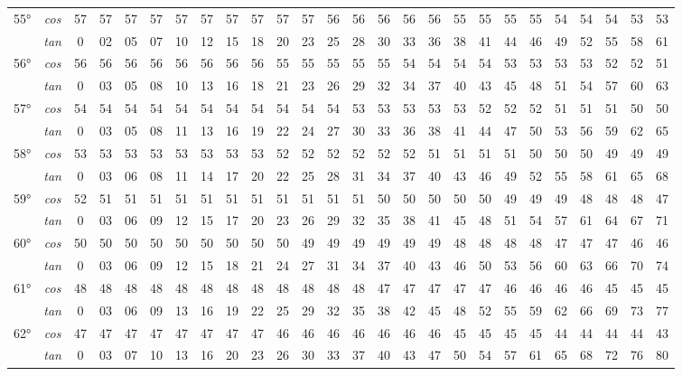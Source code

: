 \begin{tiny}
\begin{longtable}{c c |c |c |c |c |c |c |c |c |c |c |c |c |c |c |c |c |c |c |c |c |c |c |c |c}
		\multirow{2}{*}{55°}&\textit{cos}& 57& 57& 57& 57& 57& 57& 57& 57& 57& 57& 56& 56& 56& 56& 56& 55& 55& 55& 55& 54& 54& 54& 53& 53\\* \space&\textit{tan} & 0 & 02 & 05 & 07& 10& 12& 15& 18& 20& 23& 25& 28& 30& 33& 36& 38& 41& 44& 46& 49& 52& 55& 58& 61\\\hline
		\multirow{2}{*}{56°}&\textit{cos}& 56& 56& 56& 56& 56& 56& 56& 56& 55& 55& 55& 55& 55& 54& 54& 54& 54& 53& 53& 53& 53& 52& 52& 51\\* \space&\textit{tan} & 0 & 03 & 05 & 08& 10& 13& 16& 18& 21& 23& 26& 29& 32& 34& 37& 40& 43& 45& 48& 51& 54& 57& 60& 63\\\hline
		\multirow{2}{*}{57°}&\textit{cos}& 54& 54& 54& 54& 54& 54& 54& 54& 54& 54& 54& 53& 53& 53& 53& 53& 52& 52& 52& 51& 51& 51& 50& 50\\* \space&\textit{tan} & 0 & 03 & 05 & 08& 11& 13& 16& 19& 22& 24& 27& 30& 33& 36& 38& 41& 44& 47& 50& 53& 56& 59& 62& 65\\\hline
		\multirow{2}{*}{58°}&\textit{cos}& 53& 53& 53& 53& 53& 53& 53& 53& 52& 52& 52& 52& 52& 52& 51& 51& 51& 51& 50& 50& 50& 49& 49& 49\\* \space&\textit{tan} & 0 & 03 & 06 & 08& 11& 14& 17& 20& 22& 25& 28& 31& 34& 37& 40& 43& 46& 49& 52& 55& 58& 61& 65& 68\\\hline
		\multirow{2}{*}{59°}&\textit{cos}& 52& 51& 51& 51& 51& 51& 51& 51& 51& 51& 51& 51& 50& 50& 50& 50& 50& 49& 49& 49& 48& 48& 48& 47\\* \space&\textit{tan} & 0 & 03 & 06 & 09& 12& 15& 17& 20& 23& 26& 29& 32& 35& 38& 41& 45& 48& 51& 54& 57& 61& 64& 67& 71\\\hline
		\multirow{2}{*}{60°}&\textit{cos}& 50& 50& 50& 50& 50& 50& 50& 50& 50& 49& 49& 49& 49& 49& 49& 48& 48& 48& 48& 47& 47& 47& 46& 46\\* \space&\textit{tan} & 0 & 03 & 06 & 09& 12& 15& 18& 21& 24& 27& 31& 34& 37& 40& 43& 46& 50& 53& 56& 60& 63& 66& 70& 74\\\hline
		\multirow{2}{*}{61°}&\textit{cos}& 48& 48& 48& 48& 48& 48& 48& 48& 48& 48& 48& 48& 47& 47& 47& 47& 47& 46& 46& 46& 46& 45& 45& 45\\* \space&\textit{tan} & 0 & 03 & 06 & 09& 13& 16& 19& 22& 25& 29& 32& 35& 38& 42& 45& 48& 52& 55& 59& 62& 66& 69& 73& 77\\\hline
		\multirow{2}{*}{62°}&\textit{cos}& 47& 47& 47& 47& 47& 47& 47& 47& 46& 46& 46& 46& 46& 46& 46& 45& 45& 45& 45& 44& 44& 44& 44& 43\\* \space&\textit{tan} & 0 & 03 & 07& 10& 13& 16& 20& 23& 26& 30& 33& 37& 40& 43& 47& 50& 54& 57& 61& 65& 68& 72& 76& 80\\\hline

\end{longtable}
\end{tiny}
